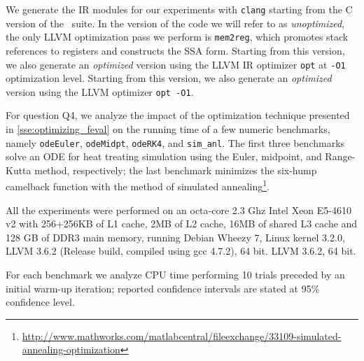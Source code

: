 \begin{description}

We generate the IR modules for our experiments with {\tt clang} starting from the C version of the \shootout\ suite. In the version of the code we will refer to as {\em unoptimized}, the only LLVM optimization pass we perform is {\tt mem2reg}, which promotes stack references to registers and constructs the SSA form.
\ifdefined \fullver
Starting from this version, we also generate an {\em optimized} version using the LLVM IR optimizer {\tt opt} at {\tt -O1} optimization level.
\else
Starting from this version, we also generate an {\em optimized} version using the LLVM optimizer {\tt opt -O1}.
\fi

For question Q4, we analyze the impact of the optimization technique presented in \mysection\ref{sse:optimizing_feval} on the running time of a few numeric benchmarks, namely {\tt odeEuler}, {\tt odeMidpt}, {\tt odeRK4}, and {\tt sim\_anl}. The first three benchmarks~\cite{recktenwald2000numerical} solve an ODE for heat treating simulation using the Euler, midpoint, and Range-Kutta method, respectively; the last benchmark minimizes the six-hump camelback function with the method of simulated annealing\footnote{\url{http://www.mathworks.com/matlabcentral/fileexchange/33109-simulated-annealing-optimization}}.


All the experiments were performed on an octa-core 2.3 Ghz Intel Xeon E5-4610 v2 with 256+256KB of L1 cache, 2MB of L2 cache, 16MB of shared L3 cache and 128 GB of DDR3 main memory, running Debian Wheezy 7, Linux kernel 3.2.0,
\ifdefined \fullver
LLVM 3.6.2 (Release build, compiled using gcc 4.7.2), 64 bit.
\else
LLVM 3.6.2, 64 bit.
\fi

For each benchmark we analyze CPU time performing 10 trials preceded by an initial warm-up iteration; reported confidence intervals are stated at 95\% confidence level.


\end{description}
